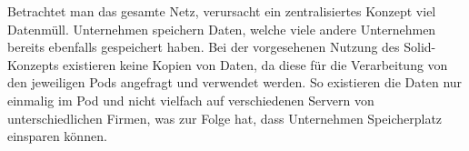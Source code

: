 \documentclass[acmtog]{acmart}
\begin{document}
Betrachtet man das gesamte Netz, verursacht ein zentralisiertes Konzept viel Datenmüll. Unternehmen speichern Daten, welche viele andere Unternehmen bereits ebenfalls gespeichert haben. Bei der vorgesehenen Nutzung des Solid-Konzepts existieren keine Kopien von Daten, da diese für die Verarbeitung von den jeweiligen Pods angefragt und verwendet werden. So existieren die Daten nur einmalig im Pod und nicht vielfach auf verschiedenen Servern von unterschiedlichen Firmen, was zur Folge hat, dass Unternehmen Speicherplatz einsparen können.






\label{section:standDerEntwicklung}
\end{document}
